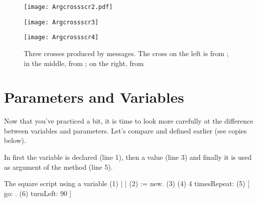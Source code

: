 \begin{figure}[!h]
\begin{minipage}[c]{.3\linewidth}
\texttt{[image: Argcrossscr2.pdf]}
\end{minipage}
\begin{minipage}[c]{.3\linewidth}
\texttt{[image: Argcrossscr3]}
\end{minipage}
\begin{minipage}[c]{.3\linewidth}
\texttt{[image: Argcrossscr4]}
\end{minipage}
\label{c8croix1}
\caption{Three crosses \newcommand{\replace}[2]{produces respectively by:}{produced by  messages. The cross on the left is from} \newcommand{\replace}[2]{,}{; in the middle, from} \newcommand{\replace}[2]{ and}{; on the right, from}  \label{fig:c8croix1}\newcommand{\add}[1]{.}}
\end{figure}




\section{Parameters and Variables}
Now that \newcommand{\replace}[2]{you}{you've} practiced a bit, it is time to look \newcommand{\remove}[1]{a bit} more carefully at the difference between variables and parameters. \newcommand{\replace}[2]{For this purpose let us}{Let's} compare \newcommand{\remove}[1]{the}  and \newcommand{\remove}[1]{the method}  \newcommand{\add}[1]{that we} defined earlier \newcommand{\replace}[2]{that we repeat here}{(see copies below)}. 

\newcommand{\replace}[2]{From the}{In}  \newcommand{\replace}[2]{we see that:  First}{first} the variable  is declared (line 1), then \newcommand{\remove}[1]{assign it} a value \newcommand{\add}[1]{is assigned to it} (line 3) and \newcommand{\replace}[2]{then}{finally} it is used as \newcommand{\add}[1]{the} argument of the method \go (line 5).

\begin{scriptwithtitle}{The square script using a variable}\label{scr:Argsquarewithvariable}
(1)   | \caro {} | 
(2)   \caro := \Turtle new.
(3)   
(4)   4 timesRepeat: 
(5)               [ \caro go: .
(6)               \caro turnLeft: 90 ]
\end{scriptwithtitle}

